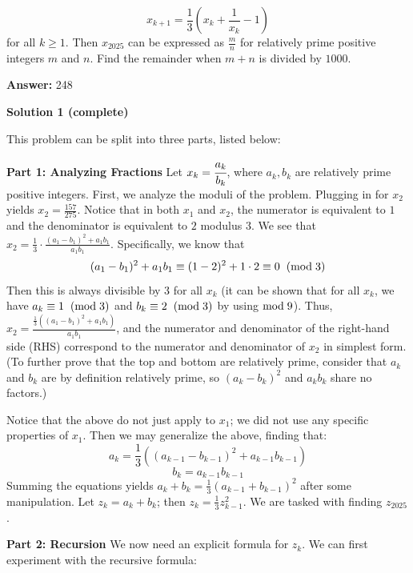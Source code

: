 \begin{enumerate}
 \[x_{k+1}=\frac{1}{3}\left(x_k+\frac{1}{x_k}-1\right)\] for all $k \geq 1$. Then $x_{2025}$ can be expressed as $\frac{m}{n}$ for relatively prime positive integers $m$ and $n$. Find the remainder when $m+n$ is divided by $1000$.


 
 \textbf{Answer: }248



\textbf{Solution 1 (complete)}

This problem can be split into three parts, listed below:

 \textbf{Part 1: Analyzing Fractions} Let $x_k=\cfrac{a_k}{b_k}$, where $a_k,b_k$ are relatively prime positive integers. First, we analyze the moduli of the problem. Plugging in for $x_2$ yields $x_2=\frac{157}{275}$. Notice that in both $x_1$ and $x_2$, the numerator is equivalent to $1$ and the denominator is equivalent to $2$ modulus $3$. We see that $x_2=\frac{1}{3}\cdot\frac{(a_1-b_1)^2+a_1b_1}{a_1b_1}$. Specifically, we know that
 \[(a_1-b_1)^2+a_1b_1\equiv(1-2)^2+1\cdot2\equiv0\hspace{2mm}(\text{mod}\hspace{1mm}3)\]Then this is always divisible by $3$ for all $x_k$ (it can be shown that for all $x_k$, we have $a_k\equiv1\hspace{2mm}(\text{mod}\hspace{1mm}3)$ and $b_k\equiv2\hspace{2mm}(\text{mod}\hspace{1mm}3)$ by using $\text{mod}\hspace{1mm}9$). Thus, $x_2=\frac{\frac{1}{3}((a_1-b_1)^2+a_1b_1)}{a_1b_1}$, and the numerator and denominator of the right-hand side (RHS) correspond to the numerator and denominator of $x_2$ in simplest form. (To further prove that the top and bottom are relatively prime, consider that $a_k$ and $b_k$ are by definition relatively prime, so $(a_k-b_k)^2$ and $a_kb_k$ share no factors.)

 Notice that the above do not just apply to $x_1$; we did not use any specific properties of $x_1$. Then we may generalize the above, finding that:
 \[a_k=\frac{1}{3}((a_{k-1}-b_{k-1})^2+a_{k-1}b_{k-1})\]
 \[b_k=a_{k-1}b_{k-1}\]Summing the equations yields $a_k+b_k=\frac{1}{3}(a_{k-1}+b_{k-1})^2$ after some manipulation. Let $z_k=a_k+b_k$; then $z_k=\frac{1}{3}z_{k-1}^2$. We are tasked with finding $z_{2025}$.

 \textbf{Part 2: Recursion} We now need an explicit formula for $z_k$. We can first experiment with the recursive formula:


\end{enumerate}
